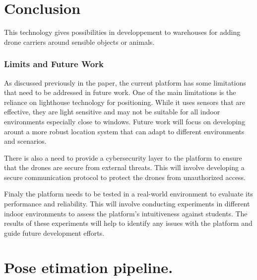\section*{Conclusion}

This technology gives possibilities in developpement to warehouses for adding drone carriers around sensible objects or animals.

\subsubsection{Limits and Future Work}

As discussed previously in the paper, the current platform has some limitations that need to be addressed in future work. One of the main limitations is the reliance on lighthouse technology \cite{noauthor_dvic_nodate} for positioning. While it uses sensors that are effective, they are light sensitive  and may not be suitable for all indoor environments especially close to windows. Future work will focus on developing arount a more robust location system that can adapt to different environments and scenarios.

There is also a need to provide a cybersecurity layer to the platform to ensure that the drones are secure from external threats. This will involve developing a secure communication protocol to protect the drones from unauthorized access.

Finaly the platform needs to be tested in a real-world environment to evaluate its performance and reliability. This will involve conducting experiments in different indoor environments to assess the platform's intuitiveness against students. The results of these experiments will help to identify any issues with the platform and guide future development efforts.

\pagebreak

\appendix
\section{Pose etimation pipeline.}\label{appendix:additional_work}

